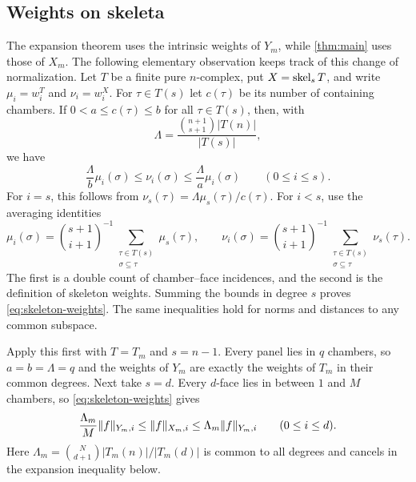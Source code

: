 \subsection{Weights on skeleta}

The expansion theorem uses the intrinsic weights of $Y_m$, while
\cref{thm:main} uses those of $X_m$. The following elementary observation
keeps track of this change of normalization.
Let $T$ be a finite pure $n$-complex, put $X=\operatorname{skel}_s T$, and write
$\mu_i=w_i^T$ and $\nu_i=w_i^X$. For $\tau\in T(s)$ let $c(\tau)$
be its number of containing chambers. If $0<a\le c(\tau)\le b$ for all
$\tau\in T(s)$, then, with
\[
 \Lambda=\frac{\binom{n+1}{s+1}|T(n)|}{|T(s)|},
\]
we have
\begin{equation}\label{eq:skeleton-weights}
 \frac{\Lambda}{b}\mu_i(\sigma)\le\nu_i(\sigma)
 \le\frac{\Lambda}{a}\mu_i(\sigma)
 \qquad(0\le i\le s).
\end{equation}
For $i=s$, this follows from $\nu_s(\tau)=\Lambda\mu_s(\tau)/c(\tau)$.
For $i<s$, use the averaging identities
\[
 \mu_i(\sigma)=\binom{s+1}{i+1}^{-1}
       \sum_{\substack{\tau\in T(s)\\\sigma\subseteq\tau}}\mu_s(\tau),
 \qquad
 \nu_i(\sigma)=\binom{s+1}{i+1}^{-1}
       \sum_{\substack{\tau\in T(s)\\\sigma\subseteq\tau}}\nu_s(\tau).
\]
The first is a double count of chamber--face incidences, and the second
is the definition of skeleton weights. Summing the bounds in degree
$s$ proves \eqref{eq:skeleton-weights}. The same inequalities hold for
norms and distances to any common subspace.

Apply this first with $T=T_m$ and $s=n-1$. Every panel lies in $q$
chambers, so $a=b=\Lambda=q$ and the weights of $Y_m$ are exactly
the weights of $T_m$ in their common degrees. Next take $s=d$.
Every $d$-face lies in between $1$ and $M$ chambers, so
\eqref{eq:skeleton-weights} gives
\begin{equation}\label{eq:norm-comparison}
 \frac{\Lambda_m}{M}\lVert f\rVert_{Y_m,i}
 \le\lVert f\rVert_{X_m,i}
 \le\Lambda_m\lVert f\rVert_{Y_m,i}\qquad(0\le i\le d).
\end{equation}
Here $\Lambda_m=\binom N{d+1}|T_m(n)|/|T_m(d)|$ is common to all degrees
and cancels in the expansion inequality below.

